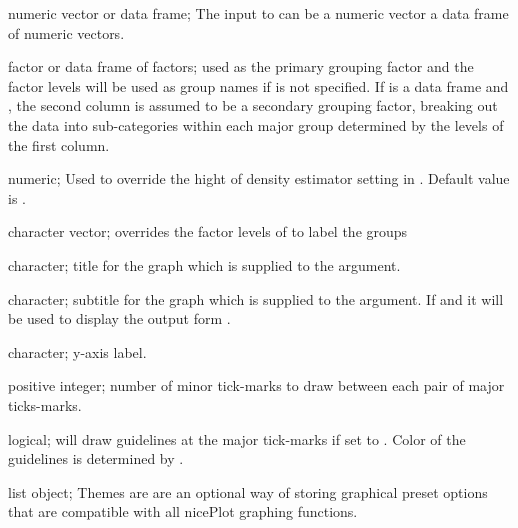 \documentclass[a4paper]{book}
\begin{document}
\begin{Arguments}
\begin{ldescription}
\item[\code{x}] numeric vector or data frame; The input to  can be a numeric vector a  data frame of numeric vectors.

\item[\code{by}] factor or data frame of factors; used as the primary grouping factor and the factor levels will be used as group names if  is not specified. If  is a data frame and , the second column is assumed to be a secondary grouping factor, breaking out the data into sub-categories within each major group determined by the levels of the first column.

\item[\code{h}] numeric; Used to override the  hight of density estimator setting in . Default value is .

\item[\code{groupNames}] character vector; overrides the factor levels of  to label the groups

\item[\code{main}] character; title for the graph which is supplied to the  argument.

\item[\code{sub}] character; subtitle for the graph which is supplied to the  argument. If  and  it will be used to display the output form .

\item[\code{ylab}] character; y-axis label.

\item[\code{minorTick}] positive integer; number of minor tick-marks to draw between each pair of major ticks-marks.

\item[\code{guides}] logical; will draw guidelines at the major tick-marks if set to . Color of the guidelines is determined by .

\item[\code{theme}] list object; Themes are are an optional way of storing graphical preset options that are compatible with all nicePlot graphing functions.


\end{ldescription}
\end{Arguments}
\end{document}
